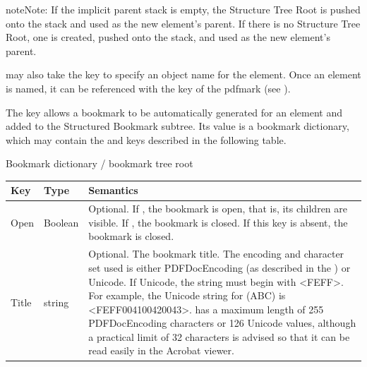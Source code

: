 \documentclass[letterpaper,12pt,english,openany,oneside]{sphinxmanual}
\begin{document}
\begin{sphinxadmonition}{note}{Note:}
If the implicit parent stack is empty, the Structure Tree Root is pushed onto the stack and used as the new element’s parent. If there is no Structure Tree Root, one is created, pushed onto the stack, and used as the new element’s parent.
\end{sphinxadmonition}

 may also take the key  to specify an object name for the element. Once an element is named, it can be referenced with the  key of the  pdfmark (see ).

The  key allows a bookmark to be automatically generated for an element and added to the Structured Bookmark subtree. Its value is a bookmark dictionary, which may contain the  and  keys described in the following table.

Bookmark dictionary / bookmark tree root


\begin{savenotes}\sphinxattablestart
\centering
{}\label{\detokenize{pdfmark_Logical:section-1}}\nobreak
\begin{tabulary}{\linewidth}[t]{|T|T|T|}
\hline
\sphinxstyletheadfamily 
Key
&\sphinxstyletheadfamily 
Type
&\sphinxstyletheadfamily 
Semantics
\\
\hline
Open
&
Boolean
&
Optional. If  , the bookmark is open, that is, its children are visible. If  , the bookmark is closed. If this key is absent, the bookmark is closed.
\\
\hline
Title
&
string
&
Optional. The bookmark title. The encoding and character set used is either PDFDocEncoding (as described in the  ) or Unicode. If Unicode, the string must begin with <FEFF>. For example, the Unicode string for (ABC) is <FEFF004100420043>.  has a maximum length of 255 PDFDocEncoding characters or 126 Unicode values, although a practical limit of 32 characters is advised so that it can be read easily in the Acrobat viewer.
\\
\hline
\end{tabulary}
\par
\sphinxattableend\end{savenotes}
\end{document}
